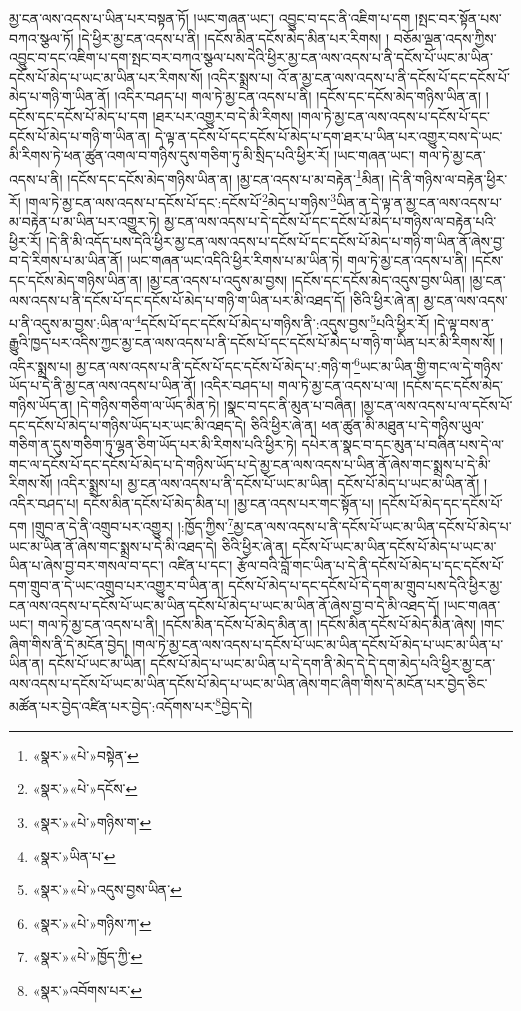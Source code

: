 མྱ་ངན་ལས་འདས་པ་ཡིན་པར་བསྟན་ཏོ། །ཡང་གཞན་ཡང་། འབྱུང་བ་དང་ནི་འཇིག་པ་དག །སྤང་བར་སྟོན་པས་བཀའ་སྩལ་ཏོ། །དེ་ཕྱིར་མྱ་ངན་འདས་པ་ནི། །དངོས་མིན་དངོས་མེད་མིན་པར་རིགས། །
བཅོམ་ལྡན་འདས་ཀྱིས་འབྱུང་བ་དང་འཇིག་པ་དག་སྤང་བར་བཀའ་སྩལ་པས་དེའི་ཕྱིར་མྱ་ངན་ལས་འདས་པ་ནི་དངོས་པོ་ཡང་མ་ཡིན་དངོས་པོ་མེད་པ་ཡང་མ་ཡིན་པར་རིགས་སོ། །འདིར་སྨྲས་པ། འོ་ན་མྱ་ངན་ལས་འདས་པ་ནི་དངོས་པོ་དང་དངོས་པོ་མེད་པ་གཉི་ག་ཡིན་ནོ། །འདིར་བཤད་པ། གལ་ཏེ་མྱ་ངན་འདས་པ་ནི། །དངོས་དང་དངོས་མེད་གཉིས་ཡིན་ན། །དངོས་དང་དངོས་པོ་མེད་པ་དག །ཐར་པར་འགྱུར་བ་དེ་མི་རིགས། །གལ་ཏེ་མྱ་ངན་ལས་འདས་པ་དངོས་པོ་དང་དངོས་པོ་མེད་པ་གཉི་ག་ཡིན་ན། དེ་ལྟ་ན་དངོས་པོ་དང་དངོས་པོ་མེད་པ་དག་ཐར་པ་ཡིན་པར་འགྱུར་བས་དེ་ཡང་མི་རིགས་ཏེ་ཕན་ཚུན་འགལ་བ་གཉིས་དུས་གཅིག་ཏུ་མི་སྲིད་པའི་ཕྱིར་རོ། །ཡང་གཞན་ཡང་། གལ་ཏེ་མྱ་ངན་འདས་པ་ནི། །དངོས་དང་དངོས་མེད་གཉིས་ཡིན་ན། །མྱ་ངན་འདས་པ་མ་བརྟེན་\footnote{«སྣར་»«པེ་»བསྟེན་}མིན། །དེ་ནི་གཉིས་ལ་བརྟེན་ཕྱིར་རོ། །གལ་ཏེ་མྱ་ངན་ལས་འདས་པ་དངོས་པོ་དང་:དངོས་པོ་\footnote{«སྣར་»«པེ་»དངོས་}མེད་པ་གཉིས་\footnote{«སྣར་»«པེ་»གཉིས་ག་}ཡིན་ན་དེ་ལྟ་ན་མྱ་ངན་ལས་འདས་པ་མ་བརྟེན་པ་མ་ཡིན་པར་འགྱུར་ཏེ། མྱ་ངན་ལས་འདས་པ་དེ་དངོས་པོ་དང་དངོས་པོ་མེད་པ་གཉིས་ལ་བརྟེན་པའི་ཕྱིར་རོ། །དེ་ནི་མི་འདོད་པས་དེའི་ཕྱིར་མྱ་ངན་ལས་འདས་པ་དངོས་པོ་དང་དངོས་པོ་མེད་པ་གཉི་ག་ཡིན་ནོ་ཞེས་བྱ་བ་དེ་རིགས་པ་མ་ཡིན་ནོ། །ཡང་གཞན་ཡང་འདིའི་ཕྱིར་རིགས་པ་མ་ཡིན་ཏེ། གལ་ཏེ་མྱ་ངན་འདས་པ་ནི། །དངོས་དང་དངོས་མེད་གཉིས་ཡིན་ན། །མྱ་ངན་འདས་པ་འདུས་མ་བྱས། །དངོས་དང་དངོས་མེད་འདུས་བྱས་ཡིན། །མྱ་ངན་ལས་འདས་པ་ནི་དངོས་པོ་དང་དངོས་པོ་མེད་པ་གཉི་ག་ཡིན་པར་མི་འཐད་དོ། །ཅིའི་ཕྱིར་ཞེ་ན། མྱ་ངན་ལས་འདས་པ་ནི་འདུས་མ་བྱས་:ཡིན་ལ་\footnote{«སྣར་»ཡིན་པ་}དངོས་པོ་དང་དངོས་པོ་མེད་པ་གཉིས་ནི་:འདུས་བྱས་\footnote{«སྣར་»«པེ་»འདུས་བྱས་ཡིན་}པའི་ཕྱིར་རོ། །དེ་ལྟ་བས་ན་རྒྱུའི་ཁྱད་པར་འདིས་ཀྱང་མྱ་ངན་ལས་འདས་པ་ནི་དངོས་པོ་དང་དངོས་པོ་མེད་པ་གཉི་ག་ཡིན་པར་མི་རིགས་སོ། །འདིར་སྨྲས་པ། མྱ་ངན་ལས་འདས་པ་ནི་དངོས་པོ་དང་དངོས་པོ་མེད་པ་:གཉི་ག་\footnote{«སྣར་»«པེ་»གཉིས་ཀ་}ཡང་མ་ཡིན་གྱི་གང་ལ་དེ་གཉིས་ཡོད་པ་དེ་ནི་མྱ་ངན་ལས་འདས་པ་ཡིན་ནོ། །འདིར་བཤད་པ། གལ་ཏེ་མྱ་ངན་འདས་པ་ལ། །དངོས་དང་དངོས་མེད་གཉིས་ཡོད་ན། །དེ་གཉིས་གཅིག་ལ་ཡོད་མིན་ཏེ། །སྣང་བ་དང་ནི་མུན་པ་བཞིན། །མྱ་ངན་ལས་འདས་པ་ལ་དངོས་པོ་དང་དངོས་པོ་མེད་པ་གཉིས་ཡོད་པར་ཡང་མི་འཐད་དེ། ཅིའི་ཕྱིར་ཞེ་ན། ཕན་ཚུན་མི་མཐུན་པ་དེ་གཉིས་ཡུལ་གཅིག་ན་དུས་གཅིག་ཏུ་ལྷན་ཅིག་ཡོད་པར་མི་རིགས་པའི་ཕྱིར་ཏེ། དཔེར་ན་སྣང་བ་དང་མུན་པ་བཞིན་པས་དེ་ལ་གང་ལ་དངོས་པོ་དང་དངོས་པོ་མེད་པ་དེ་གཉིས་ཡོད་པ་དེ་མྱ་ངན་ལས་འདས་པ་ཡིན་ནོ་ཞེས་གང་སྨྲས་པ་དེ་མི་རིགས་སོ། །འདིར་སྨྲས་པ། མྱ་ངན་ལས་འདས་པ་ནི་དངོས་པོ་ཡང་མ་ཡིན། དངོས་པོ་མེད་པ་ཡང་མ་ཡིན་ནོ། །འདིར་བཤད་པ། དངོས་མིན་དངོས་པོ་མེད་མིན་པ། །མྱ་ངན་འདས་པར་གང་སྟོན་པ། །དངོས་པོ་མེད་དང་དངོས་པོ་དག །གྲུབ་ན་དེ་ནི་འགྲུབ་པར་འགྱུར། །:ཁྱོད་ཀྱིས་\footnote{«སྣར་»«པེ་»ཁྱོད་ཀྱི་}མྱ་ངན་ལས་འདས་པ་ནི་དངོས་པོ་ཡང་མ་ཡིན་དངོས་པོ་མེད་པ་ཡང་མ་ཡིན་ནོ་ཞེས་གང་སྨྲས་པ་དེ་མི་འཐད་དེ། ཅིའི་ཕྱིར་ཞེ་ན། དངོས་པོ་ཡང་མ་ཡིན་དངོས་པོ་མེད་པ་ཡང་མ་ཡིན་པ་ཞེས་བྱ་བར་གསལ་བ་དང་། འཛིན་པ་དང་། རྩོལ་བའི་བློ་གང་ཡིན་པ་དེ་ནི་དངོས་པོ་མེད་པ་དང་དངོས་པོ་དག་གྲུབ་ན་དེ་ཡང་འགྲུབ་པར་འགྱུར་བ་ཡིན་ན། དངོས་པོ་མེད་པ་དང་དངོས་པོ་དེ་དག་མ་གྲུབ་པས་དེའི་ཕྱིར་མྱ་ངན་ལས་འདས་པ་དངོས་པོ་ཡང་མ་ཡིན་དངོས་པོ་མེད་པ་ཡང་མ་ཡིན་ནོ་ཞེས་བྱ་བ་དེ་མི་འཐད་དོ། །ཡང་གཞན་ཡང་། གལ་ཏེ་མྱ་ངན་འདས་པ་ནི། །དངོས་མིན་དངོས་པོ་མེད་མིན་ན། །དངོས་མིན་དངོས་པོ་མེད་མིན་ཞེས། །གང་ཞིག་གིས་ནི་དེ་མངོན་བྱེད། །གལ་ཏེ་མྱ་ངན་ལས་འདས་པ་དངོས་པོ་ཡང་མ་ཡིན་དངོས་པོ་མེད་པ་ཡང་མ་ཡིན་པ་ཡིན་ན། དངོས་པོ་ཡང་མ་ཡིན། དངོས་པོ་མེད་པ་ཡང་མ་ཡིན་པ་དེ་དག་ནི་མེད་དེ་དེ་དག་མེད་པའི་ཕྱིར་མྱ་ངན་ལས་འདས་པ་དངོས་པོ་ཡང་མ་ཡིན་དངོས་པོ་མེད་པ་ཡང་མ་ཡིན་ཞེས་གང་ཞིག་གིས་དེ་མངོན་པར་བྱེད་ཅིང་མཚོན་པར་བྱེད་འཛིན་པར་བྱེད་:འདོགས་པར་\footnote{«སྣར་»འབོགས་པར་}བྱེད་དེ། 